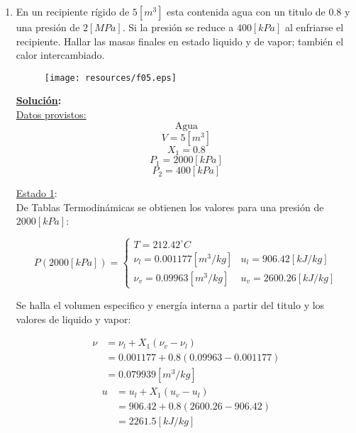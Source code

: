 \documentclass[letter,11pt]{article}
\begin{document}
\begin{enumerate}
\item En un recipiente rígido de $5[m^3]$ esta contenida agua con un titulo de
$0.8$ y una presión de $2[MPa]$. Si la presión se reduce a $400[kPa]$ al
enfriarse el recipiente. Hallar las masas finales en estado liquido y de vapor;
también el calor intercambiado.

\begin{figure}[H]
\centering
\texttt{[image: resources/f05.eps]}
\end{figure}

\textbf{\underline{Solución}:} \\

\underline{Datos provistos:}
\begin{equation*}
    \text{Agua}
\end{equation*}
\begin{equation*}
    V = 5[m^3]
\end{equation*}
\begin{equation*}
    X_1 = 0.8
\end{equation*}
\begin{equation*}
    P_1 = 2000[kPa]
\end{equation*}
\begin{equation*}
    P_2 = 400[kPa]
\end{equation*}

\underline{Estado 1}: \\
De Tablas Termodinámicas se obtienen los valores para una presión de
$2000[kPa]$:

\begin{equation*}
    P(2000[kPa]) = \begin{cases}
        T = 212.42^\circ C\\
        \nu_l = 0.001177[m^3/kg] & u_l = 906.42[kJ/kg] \\
        \nu_v = 0.09963[m^3/kg]  & u_v = 2600.26[kJ/kg]
    \end{cases}
\end{equation*}

Se halla el volumen especifico y energía interna a partir del titulo y los
valores de liquido y vapor:

\begin{equation*}
    \begin{split}
        \nu &= \nu_l + X_1(\nu_v - \nu_l) \\
            &= 0.001177 + 0.8 (0.09963 - 0.001177) \\
            &= 0.079939[m^3/kg]
    \end{split}
\end{equation*}
\begin{equation*}
    \begin{split}
        u &= u_l + X_1(u_v - u_l) \\
          &= 906.42 + 0.8 (2600.26 - 906.42) \\
          &= 2261.5[kJ/kg]
    \end{split}
\end{equation*}


\end{enumerate}
\end{document}
